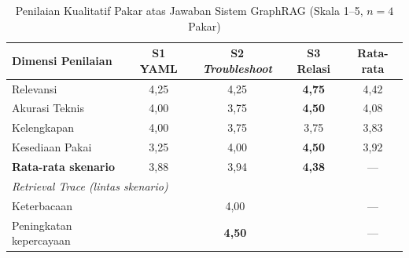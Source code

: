 \renewcommand{\arraystretch}{1.3}
\captionsetup[table]{justification=raggedright,singlelinecheck=false}
\begin{table}[H]
\caption{Penilaian Kualitatif Pakar atas Jawaban Sistem GraphRAG (Skala 1--5, $n{=}4$ Pakar)}
\label{tbl:expert_answer_ratings}
\centering
\begin{tabular}{| p{} | c | c | c | c |}
\hline
\textbf{Dimensi Penilaian} & \textbf{S1 YAML} & \textbf{S2 \textit{Troubleshoot}} & \textbf{S3 Relasi} & \textbf{Rata-rata} \\
\hline
Relevansi & 4,25 & 4,25 & \textbf{4,75} & 4,42 \\
\hline
Akurasi Teknis & 4,00 & 3,75 & \textbf{4,50} & 4,08 \\
\hline
Kelengkapan & 4,00 & 3,75 & 3,75 & 3,83 \\
\hline
Kesediaan Pakai & 3,25 & 4,00 & \textbf{4,50} & 3,92 \\
\hline
\textbf{Rata-rata skenario} & 3,88 & 3,94 & \textbf{4,38} & --- \\
\hline
\multicolumn{5}{|l|}{\textit{Retrieval Trace (lintas skenario)}} \\
\hline
Keterbacaan & \multicolumn{3}{c|}{4,00} & --- \\
\hline
Peningkatan kepercayaan & \multicolumn{3}{c|}{\textbf{4,50}} & --- \\
\hline
\end{tabular}
\end{table}
